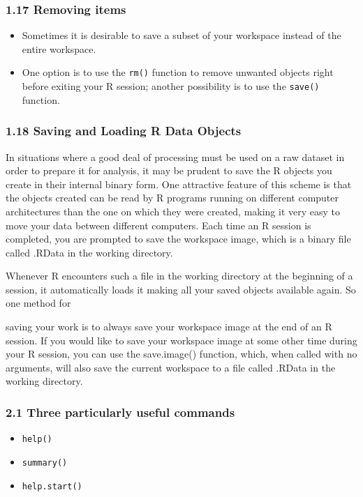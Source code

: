  
 \frametitle{1.17 Removing items}
 \begin{itemize}
 \item Sometimes it is desirable to save a subset of your workspace instead of the entire workspace.
 \item One option is to use the \texttt{rm()} function to remove unwanted objects right before exiting your R
 session; another possibility is to use the \texttt{save()} function.
 \end{itemize}
 
 
 \frametitle{1.18 Saving and Loading R Data Objects}
 In situations where a good deal of processing must be used on a raw dataset in order to prepare
 it for analysis, it may be prudent to save the R objects you create in their internal binary form.
 One attractive feature of this scheme is that the objects created can be read by R programs
 running on different computer architectures than the one on which they were created, making it
 very easy to move your data between different computers. Each time an R session is completed,
 you are prompted to save the workspace image, which is a binary file called .RData in the
 working directory.
 
 
 Whenever R encounters such a file in the working directory at the beginning of a session,
 it automatically loads it making all your saved objects available again. So one method for
 
 saving your work is to always save your workspace image at the end of an R session. If you
 would like to save your workspace image at some other time during your R session, you can use
 the save.image() function, which, when called with no arguments, will also save the current
 workspace to a file called .RData in the working directory.
 
 
 
 
 \frametitle{2.1 Three particularly useful commands}
 
 \begin{itemize}
 \item \texttt{help()}
 \item \texttt{summary()}
 \item \texttt{help.start()}
 \end{itemize}
 
